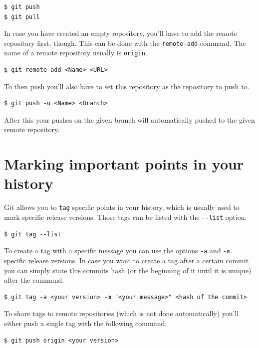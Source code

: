 \documentclass[a4paper, 12pt]{article}
\begin{document}
		\begin{lstlisting}
$ git push
$ git pull
		\end{lstlisting}
		
		In case you have created an empty repository, you'll have to add the remote repository first, though. This can be done with the \lstinline|remote-add|-command. The name of a remote repository usually is \lstinline|origin|.
		
		\begin{lstlisting}
$ git remote add <Name> <URL>
		\end{lstlisting}
		
		To then push you'll also have to set this repository as the repository to push to.
		
		\begin{lstlisting}
$ git push -u <Name> <Branch>
		\end{lstlisting}
		
		After this your pushes on the given branch will automatically pushed to the given remote repository.

	\section{Marking important points in your history}
	
		Git allows you to \lstinline|tag| specific points in your history, which is usually used to mark specific release versions. Those tags can be listed with the \lstinline|--list| option.
		
		\begin{lstlisting}
$ git tag --list
		\end{lstlisting}
		
		To create a tag with a specific message you can use the options \lstinline|-a| and \lstinline|-m|. specific release versions. In case you want to create a tag after a certain commit you can simply state this commits hash (or the beginning of it until it is unique) after the command.
		
		\begin{lstlisting}
$ git tag -a <your version> -m "<your message>" <hash of the commit>
		\end{lstlisting}
		
		To share tags to remote repositories (which is not done automatically) you'll either push a single tag with the following command: 
		
		\begin{lstlisting}
$ git push origin <your version>
		\end{lstlisting}
		
\end{document}

